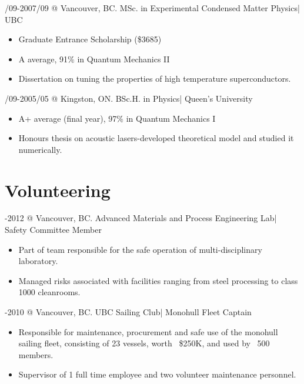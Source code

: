 \documentclass[10pt,letterpaper]{resume}
\begin{document}
/09-2007/09 @ Vancouver, BC. MSc. in Experimental Condensed Matter Physics| UBC
\begin{itemize}
\item Graduate Entrance Scholarship (\$3685)
\item A average, 91$\%$ in Quantum Mechanics II
\item Dissertation on tuning the properties of high temperature superconductors.
\end{itemize}

/09-2005/05 @ Kingston, ON. BSc.H. in Physics| Queen's University
\begin{itemize}
\item A+ average (final year), 97$\%$ in Quantum Mechanics I
\item Honours thesis on acoustic lasers-developed theoretical model and studied it numerically.
\end{itemize}
 


\section{Volunteering}

-2012 @ Vancouver, BC. Advanced Materials and Process Engineering Lab| Safety Committee Member
\begin{itemize}
\item Part of team responsible for the safe operation of multi-disciplinary laboratory.
\item Managed risks associated with facilities ranging from steel processing to class 1000 cleanrooms.
\end{itemize}

-2010 @ Vancouver, BC. UBC Sailing Club| Monohull Fleet Captain
\begin{itemize}
\item Responsible for maintenance, procurement and safe use of the monohull sailing fleet, consisting of 23 vessels, worth ~\$250K, and used by ~500 members.
\item Supervisor of 1 full time employee and two volunteer maintenance personnel.
\end{itemize}

\end{document}
